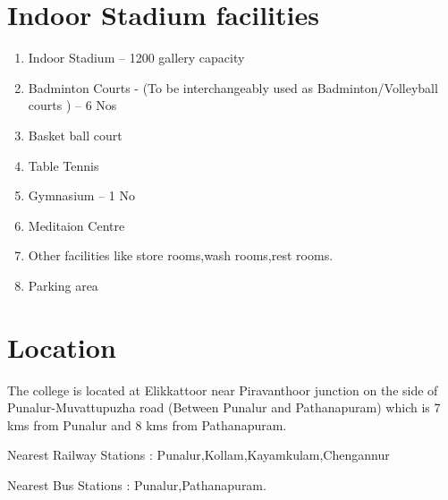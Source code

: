 \section{	Indoor Stadium facilities}	
\begin{enumerate}
	\item Indoor Stadium  – 1200 gallery capacity	\item  Badminton Courts - (To be interchangeably used as Badminton/Volleyball courts ) – 6 Nos	\item Basket ball court
	\item Table Tennis
	\item  Gymnasium – 1 No
	\item Meditaion Centre
	\item  Other facilities like store rooms,wash rooms,rest rooms.
	\item  Parking area
\end{enumerate}

\section{Location}
The college is located at Elikkattoor near Piravanthoor junction on the side of Punalur-Muvattupuzha road (Between Punalur and Pathanapuram) which is 7 kms from Punalur and 8 kms from Pathanapuram.

Nearest Railway Stations : Punalur,Kollam,Kayamkulam,Chengannur

Nearest Bus Stations : Punalur,Pathanapuram.


